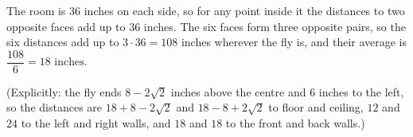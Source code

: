 The room is $36$ inches on each side, so for any point inside it the distances to two opposite faces add up to $36$ inches. The six faces form three opposite pairs, so the six distances add up to $3\cdot36=108$ inches wherever the fly is, and their average is $\dfrac{108}{6}=\boxed{18\text{ inches}}$.

(Explicitly: the fly ends $8-2\sqrt2$ inches above the centre and $6$ inches to the left, so the distances are $18+8-2\sqrt2$ and $18-8+2\sqrt2$ to floor and ceiling, $12$ and $24$ to the left and right walls, and $18$ and $18$ to the front and back walls.)
